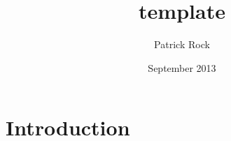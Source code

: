 \documentclass{article}
\title{template}
\author{Patrick Rock}
\date{September 2013}
\begin{document}
\maketitle

\section{Introduction}
\end{document}
